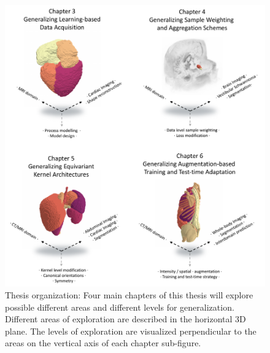             \begin{figure}
                \includegraphics[width=\textwidth]{sections/01_introduction/figures/draft_areas_levels.pdf}
                \caption{Thesis organization: Four main chapters of this thesis will explore possible different areas and different levels for generalization. Different areas of exploration are described in the horizontal 3D plane. The levels of exploration are visualized perpendicular to the areas on the vertical axis of each chapter sub-figure.}
                \label{fig:draft}
            \end{figure}

